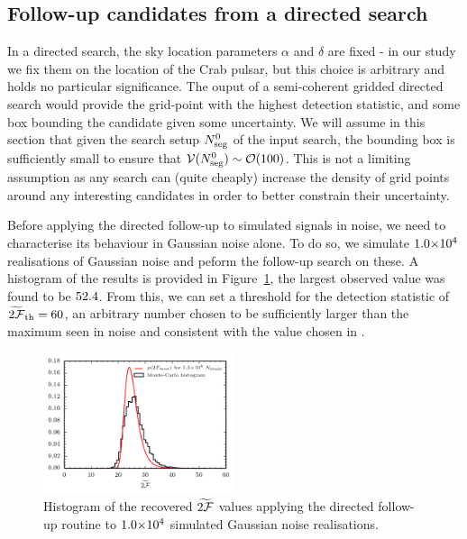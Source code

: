\documentclass[aps, prd, twocolumn, superscriptaddress, floatfix, showpacs, nofootinbib, longbibliography]{revtex4-1}
\begin{document}
\subsection{Follow-up candidates from a directed search}
\label{sec_directed_follow_up}

In a directed search, the sky location parameters $\alpha$ and $\delta$ are
fixed - in our study we fix them on the location of the Crab pulsar, but this
choice is arbitrary and holds no particular significance. The ouput of a
semi-coherent gridded directed search would provide the grid-point with the
highest detection statistic, and some box bounding the candidate given some
uncertainty. We will assume in this section that given the search setup
$N_{\rm seg}^{0}$ of the input search, the bounding box is sufficiently small to
ensure that $\mathcal{V}(N_{\rm seg}^0)\sim \mathcal{O}(100)$. This is not a limiting
assumption as any search can (quite cheaply) increase the density of grid
points around any interesting candidates in order to better constrain their
uncertainty.

Before applying the directed follow-up to simulated signals in noise, we need
to characterise its behaviour in Gaussian noise alone. To do so, we simulate
$1.0{\times}10^{4}$ realisations of Gaussian noise and peform the follow-up
search on these. A histogram of the results is provided in
Figure~\ref{fig_hist_DirectedMCNoiseOnly}, the largest observed value was
found to be $52.4$. From this, we can set a threshold
for the detection statistic of $\widetilde{2{\mathcal{F}}}_{\rm th} = 60$, an arbitrary
number chosen to be sufficiently larger than the maximum seen in noise and
consistent with the value chosen in \citet{shaltev2013}.
\begin{figure}[htb]
\centering
\includegraphics[width=0.5\textwidth]{directed_noise_twoF_histogram}
\caption{Histogram of the recovered $\widetilde{2{\mathcal{F}}}$ values applying the
directed follow-up routine to $1.0{\times}10^{4}$ simulated Gaussian noise
realisations.}
\label{fig_hist_DirectedMCNoiseOnly}
\end{figure}
\end{document}
